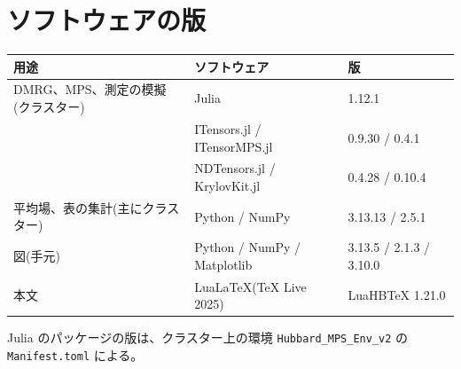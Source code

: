 \section*{ソフトウェアの版}
\begin{center}\small
\begin{tabular}{@{}lll@{}}
\toprule
用途 & ソフトウェア & 版 \\
\midrule
DMRG、MPS、測定の模擬(クラスター) & Julia & 1.12.1 \\
 & ITensors.jl / ITensorMPS.jl & 0.9.30 / 0.4.1 \\
 & NDTensors.jl / KrylovKit.jl & 0.4.28 / 0.10.4 \\
平均場、表の集計(主にクラスター) & Python / NumPy & 3.13.13 / 2.5.1 \\
図(手元) & Python / NumPy / Matplotlib & 3.13.5 / 2.1.3 / 3.10.0 \\
本文 & Lua\LaTeX(TeX Live 2025) & LuaHBTeX 1.21.0 \\
\bottomrule
\end{tabular}
\end{center}
Julia のパッケージの版は、クラスター上の環境 \texttt{Hubbard\_MPS\_Env\_v2} の \texttt{Manifest.toml} による。
